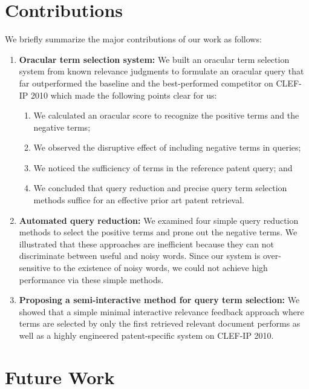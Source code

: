 \section{Contributions}
\label{sec:contributions}
We briefly summarize the major contributions of our work as follows:
\begin{enumerate}
\item \textbf{Oracular term selection system: }We built an oracular term selection system from known relevance judgments to formulate an oracular query that far outperformed the baseline and the best-performed competitor on CLEF-IP 2010 which made the following points clear for us:
\begin{enumerate}
\item We calculated an oracular score to recognize the positive terms and the negative terms;
\item We observed the disruptive effect of including negative terms in queries;
\item We noticed the sufficiency of terms in the reference patent query; and 
\item We concluded that query reduction and precise query term selection methods suffice for an effective prior art patent retrieval.
\end{enumerate}
\item \textbf{Automated query reduction: } We examined four simple query reduction methods to select the positive terms and prone out the negative terms. We illustrated that these approaches are inefficient because they can not discriminate between useful and noisy words. Since our system is over-sensitive to the existence of noisy words, we could not achieve high performance via these simple methods. 
\item \textbf{Proposing a semi-interactive method for query term selection: }We showed that a simple minimal interactive relevance feedback approach where terms are selected by only the first retrieved relevant document performs as well as a highly engineered patent-specific system on CLEF-IP 2010. 
\end{enumerate}

\section{Future Work}
\label{sec:future}




